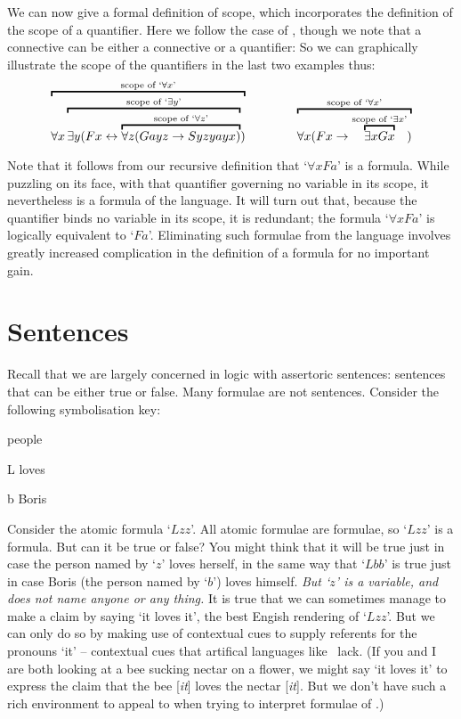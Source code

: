 We can now give a formal definition of scope, which incorporates the definition of the scope of a quantifier. Here we follow the case of \TFL, though we note that a connective can be either a connective or a quantifier:
So we can graphically illustrate the scope of the quantifiers in the last two examples thus:
	$$\overbracket{\forall x \overbracket{\exists y (Fx \eiff \overbracket{\forall z (Gayz \eif Syzyayx)}^{\text{scope of `}\forall z\text{'}}}^{\text{scope of `}\exists y\text{'}})}^{\text{scope of `}\forall x\text{'}} \qquad\qquad 
\overbracket{\forall x (Fx \to \overbracket{\exists x Gx}^{\text{scope of `$\exists x$'}})}^{\text{scope of `$\forall x$'}}	$$

Note that it follows from our recursive definition that `$\forall x Fa$' is a formula. While puzzling on its face, with that quantifier governing no variable in its scope, it nevertheless is a formula of the language. It will turn out that, because the quantifier binds no variable in its scope, it is redundant; the formula `$\forall xFa$' is logically equivalent to `$Fa$'. Eliminating such formulae from the language involves greatly increased complication in the definition of a formula for no important gain.

\section{Sentences}
Recall that we are largely concerned in logic with assertoric sentences: sentences that can be either true or false. Many formulae are not sentences. Consider the following symbolisation key:
	\begin{ekey}
		\item[\text{domain}] people
		\item[L]  loves 
		\item[b] Boris
	\end{ekey}
Consider the atomic formula `$Lzz$'. All atomic formulae are formulae, so `$Lzz$' is a formula. But can it be true or false? You might think that it will be true just in case the person named by `$z$' loves herself, in the same way that `$Lbb$' is true just in case Boris (the person named by `$b$') loves himself. \emph{But `$z$' is a variable, and does not name anyone or any thing.} It is true that we can sometimes manage to make a claim by saying `it loves it', the best Engish rendering of `$Lzz$'. But we can only do so by making use of contextual cues to supply referents for the pronouns `it' – contextual cues that artifical languages like \FOL\ lack. (If you and I are both looking at a bee sucking nectar on a flower, we might say `it loves it' to express the claim that the bee [\emph{it}]  loves the nectar [\emph{it}]. But we don't have such a rich environment to appeal to when trying to interpret formulae of \FOL.)

